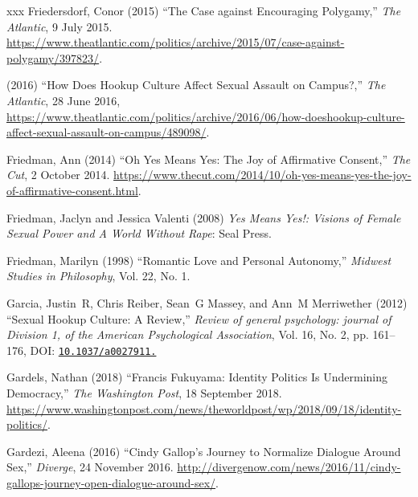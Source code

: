 \documentclass[]{jlreq} \usepackage{mystyle}
\begin{document}
\begin{thebibliography}{xxx}
Friedersdorf, Conor (2015) ``The Case against Encouraging Polygamy,'' \emph{The
  Atlantic}, 9 July 2015.
  \url{https://www.theatlantic.com/politics/archive/2015/07/case-against-polygamy/397823/}.

 \bysame{}  (2016) ``How Does Hookup Culture Affect Sexual Assault on
  Campus?,'' \emph{The Atlantic}, 28 June 2016,
  \url{https://www.theatlantic.com/politics/archive/2016/06/how-doeshookup-culture-affect-sexual-assault-on-campus/489098/}.

Friedman, Ann (2014) ``Oh Yes Means Yes: The Joy of Affirmative Consent,''
  \emph{The Cut}, 2 October 2014.
  \url{https://www.thecut.com/2014/10/oh-yes-means-yes-the-joy-of-affirmative-consent.html}.

Friedman, Jaclyn and Jessica Valenti (2008)  \textit{ Yes Means Yes!: Visions
  of Female Sexual Power and A World Without Rape}: Seal Press.

Friedman, Marilyn (1998) ``Romantic Love and Personal Autonomy,'' \textit{
  Midwest Studies in Philosophy}, Vol. 22, No. 1.

Garcia, Justin~R, Chris Reiber, Sean~G Massey, and Ann~M Merriwether (2012)
  ``Sexual Hookup Culture: A Review,'' \textit{ Review of general psychology:
  journal of Division 1, of the American Psychological Association}, Vol. 16,
  No. 2, pp. 161--176, DOI:
  \href{http://dx.doi.org/10.1037/a0027911.}{
  \nolinkurl{10.1037/a0027911.}}

Gardels, Nathan (2018) ``Francis Fukuyama: Identity Politics Is Undermining
  Democracy,'' \emph{The Washington Post}, 18 September 2018.
  \url{https://www.washingtonpost.com/news/theworldpost/wp/2018/09/18/identity-politics/}.

Gardezi, Aleena (2016) ``Cindy Gallop's Journey to Normalize Dialogue Around
  Sex,'' \emph{Diverge}, 24 November 2016.
  \url{http://divergenow.com/news/2016/11/cindy-gallops-journey-open-dialogue-around-sex/}.


\end{thebibliography}
\end{document}
